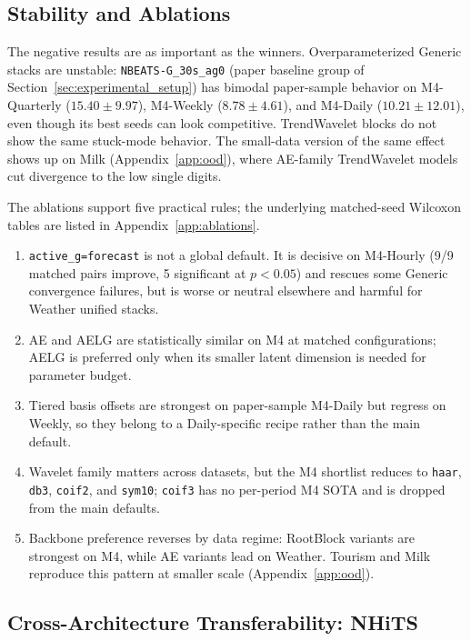 \documentclass{article}
\begin{document}
\subsection{Stability and Ablations}
\label{sec:depth_stability}

The negative results are as important as the winners. Overparameterized Generic stacks are unstable: \texttt{NBEATS-G\_30s\_ag0} (paper baseline group of Section~\ref{sec:experimental_setup}) has bimodal paper-sample behavior on M4-Quarterly ($15.40 \pm 9.97$), M4-Weekly ($8.78 \pm 4.61$), and M4-Daily ($10.21 \pm 12.01$), even though its best seeds can look competitive. TrendWavelet blocks do not show the same stuck-mode behavior. The small-data version of the same effect shows up on Milk (Appendix~\ref{app:ood}), where AE-family TrendWavelet models cut divergence to the low single digits.

The ablations support five practical rules; the underlying matched-seed Wilcoxon tables are listed in Appendix~\ref{app:ablations}.
\begin{enumerate}
\item \texttt{active\_g=forecast} is not a global default. It is decisive on M4-Hourly (9/9 matched pairs improve, 5 significant at $p<0.05$) and rescues some Generic convergence failures, but is worse or neutral elsewhere and harmful for Weather unified stacks.
\item AE and AELG are statistically similar on M4 at matched configurations; AELG is preferred only when its smaller latent dimension is needed for parameter budget.
\item Tiered basis offsets are strongest on paper-sample M4-Daily but regress on Weekly, so they belong to a Daily-specific recipe rather than the main default.
\item Wavelet family matters across datasets, but the M4 shortlist reduces to \texttt{haar}, \texttt{db3}, \texttt{coif2}, and \texttt{sym10}; \texttt{coif3} has no per-period M4 SOTA and is dropped from the main defaults.
\item Backbone preference reverses by data regime: RootBlock variants are strongest on M4, while AE variants lead on Weather. Tourism and Milk reproduce this pattern at smaller scale (Appendix~\ref{app:ood}).
\end{enumerate}

\subsection{Cross-Architecture Transferability: NHiTS}
\label{sec:transfer_summary}
\end{document}
